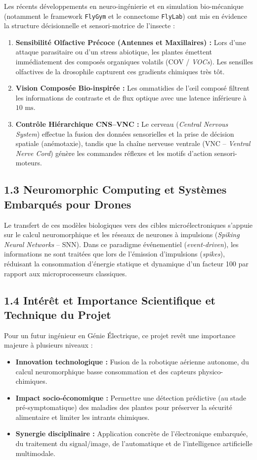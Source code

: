 \documentclass[11pt,a4paper]{article}
\begin{document}
Les récents développements en neuro-ingénierie et en simulation bio-mécanique (notamment le framework \texttt{FlyGym} et le connectome \texttt{FlyLab}) ont mis en évidence la structure décisionnelle et sensori-motrice de l'insecte :
\begin{enumerate}
    \item \textbf{Sensibilité Olfactive Précoce (Antennes et Maxillaires) :} Lors d'une attaque parasitaire ou d'un stress abiotique, les plantes émettent immédiatement des composés organiques volatils (COV / \textit{VOCs}). Les sensilles olfactives de la drosophile capturent ces gradients chimiques très tôt.
    \item \textbf{Vision Composée Bio-inspirée :} Les ommatidies de l'œil composé filtrent les informations de contraste et de flux optique avec une latence inférieure à $10\text{ ms}$.
    \item \textbf{Contrôle Hiérarchique CNS--VNC :} Le cerveau (\textit{Central Nervous System}) effectue la fusion des données sensorielles et la prise de décision spatiale (anémotaxie), tandis que la chaîne nerveuse ventrale (VNC -- \textit{Ventral Nerve Cord}) génère les commandes réflexes et les motifs d'action sensori-moteurs.
\end{enumerate}

\subsection*{\color{secondarygreen}1.3 Neuromorphic Computing et Systèmes Embarqués pour Drones}
Le transfert de ces modèles biologiques vers des cibles microélectroniques s'appuie sur le calcul neuromorphique et les réseaux de neurones à impulsions (\textit{Spiking Neural Networks} -- SNN). Dans ce paradigme événementiel (\textit{event-driven}), les informations ne sont traitées que lors de l'émission d'impulsions (\textit{spikes}), réduisant la consommation d'énergie statique et dynamique d'un facteur 100 par rapport aux microprocesseurs classiques.

\subsection*{\color{secondarygreen}1.4 Intérêt et Importance Scientifique et Technique du Projet}
Pour un futur ingénieur en Génie Électrique, ce projet revêt une importance majeure à plusieurs niveaux :
\begin{itemize}
    \item \textbf{Innovation technologique :} Fusion de la robotique aérienne autonome, du calcul neuromorphique basse consommation et des capteurs physico-chimiques.
    \item \textbf{Impact socio-économique :} Permettre une détection prédictive (au stade pré-symptomatique) des maladies des plantes pour préserver la sécurité alimentaire et limiter les intrants chimiques.
    \item \textbf{Synergie disciplinaire :} Application concrète de l'électronique embarquée, du traitement du signal/image, de l'automatique et de l'intelligence artificielle multimodale.
\end{itemize}
\end{document}
